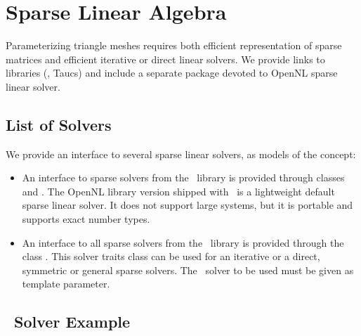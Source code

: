 \section{Sparse Linear Algebra \label{sec:Sparse-Linear-Algebra}}

Parameterizing triangle meshes requires both efficient representation
of sparse matrices and efficient iterative or direct linear
solvers. We provide links to libraries (\eigen, {\sc Taucs})
and include a separate package devoted to OpenNL sparse linear solver.

\subsection{List of Solvers}

We provide an interface to several sparse linear solvers, as models
of the  concept:

\begin{itemize}
\item
    An interface to sparse solvers from the \opennl\ library \cite{cgal:l-nmdgp-05} is provided through classes
     and 
    . The OpenNL library version shipped with \cgal\
    is a lightweight default sparse linear solver. It does not support large systems, but it is portable and
    supports exact number types.

\item
    An interface to all sparse solvers from the \ccThirdPartyEigen\ library is provided through the class
    \ccc{CGAL::Eigen_solver_traits<T>}. This solver traits class can be used for an iterative or a direct,
    symmetric or general sparse solvers. The \eigen\ solver to be used must be given as template parameter.

\end{itemize}


\subsection{\eigen\ Solver Example}

